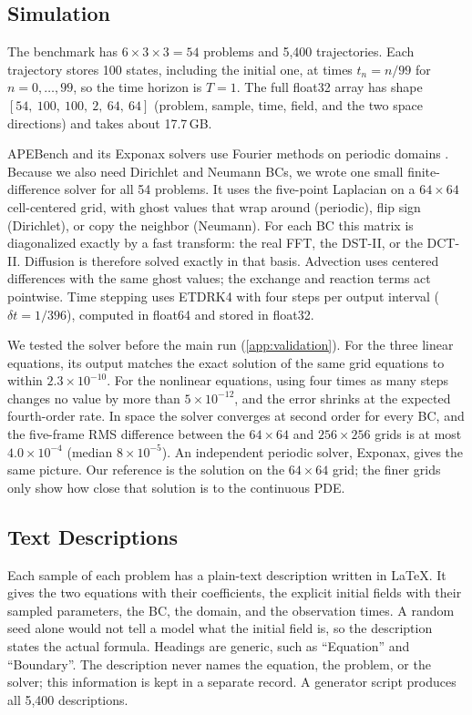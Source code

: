 \subsection{Simulation}
\label{sec:simulator}
The benchmark has $6\times3\times3=54$ problems and 5,400 trajectories. Each trajectory stores 100 states, including the initial one, at times $t_n=n/99$ for $n=0,\ldots,99$, so the time horizon is $T=1$. The full float32 array has shape $[54,\ 100,\ 100,\ 2,\ 64,\ 64]$ (problem, sample, time, field, and the two space directions) and takes about 17.7\,GB.

APEBench and its Exponax solvers use Fourier methods on periodic domains \citep{koehler2024apebench,apebench_docs,exponax_docs}. Because we also need Dirichlet and Neumann BCs, we wrote one small finite-difference solver for all 54 problems. It uses the five-point Laplacian on a $64\times64$ cell-centered grid, with ghost values that wrap around (periodic), flip sign (Dirichlet), or copy the neighbor (Neumann). For each BC this matrix is diagonalized exactly by a fast transform: the real FFT, the DST-II, or the DCT-II. Diffusion is therefore solved exactly in that basis. Advection uses centered differences with the same ghost values; the exchange and reaction terms act pointwise. Time stepping uses ETDRK4 \citep{cox2002etd,kassam2005etdrk4} with four steps per output interval ($\delta t=1/396$), computed in float64 and stored in float32.

We tested the solver before the main run (\cref{app:validation}). For the three linear equations, its output matches the exact solution of the same grid equations to within $2.3\times10^{-10}$. For the nonlinear equations, using four times as many steps changes no value by more than $5\times10^{-12}$, and the error shrinks at the expected fourth-order rate. In space the solver converges at second order for every BC, and the five-frame RMS difference between the $64\times64$ and $256\times256$ grids is at most $4.0\times10^{-4}$ (median $8\times10^{-5}$). An independent periodic solver, Exponax, gives the same picture. Our reference is the solution on the $64\times64$ grid; the finer grids only show how close that solution is to the continuous PDE.

\subsection{Text Descriptions}
Each sample of each problem has a plain-text description written in LaTeX. It gives the two equations with their coefficients, the explicit initial fields with their sampled parameters, the BC, the domain, and the observation times. A random seed alone would not tell a model what the initial field is, so the description states the actual formula. Headings are generic, such as ``Equation'' and ``Boundary''. The description never names the equation, the problem, or the solver; this information is kept in a separate record. A generator script produces all 5,400 descriptions.
